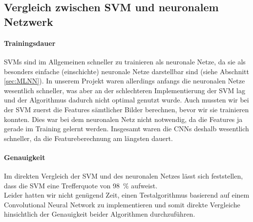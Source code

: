 \subsection{Vergleich zwischen SVM und neuronalem Netzwerk}

\paragraph{Trainingsdauer}

SVMs sind im Allgemeinen schneller zu trainieren als neuronale Netze, da sie als besonders einfache (einschichte) neuronale Netze darstellbar sind (siehe Abschnitt \ref{sec:MLNN}). In unserem Projekt waren allerdings anfangs die neuronalen Netze wesentlich schneller, was aber an der schlechteren Implementierung der SVM lag und der Algorithmus dadurch nicht optimal genutzt wurde. Auch mussten wir bei der SVM zuerst die Features sämtlicher Bilder berechnen, bevor wir sie trainieren konnten. Dies war bei dem neuronalen Netz nicht notwendig, da die Features ja gerade im Training gelernt werden. Insgesamt waren die CNNs deshalb wesentlich schneller, da die Featureberechnung am längsten dauert.

\paragraph{Genauigkeit}
Im direkten Vergleich der SVM und des neuronalen Netzes lässt sich feststellen, dass die SVM eine Trefferquote von 98~\% aufweist. \\
Leider hatten wir nicht genügend Zeit, einen Testalgorithmus basierend auf einem Convolutional Neural Network zu implementieren und somit direkte Vergleiche hinsichtlich der Genauigkeit beider Algorithmen durchzuführen.
